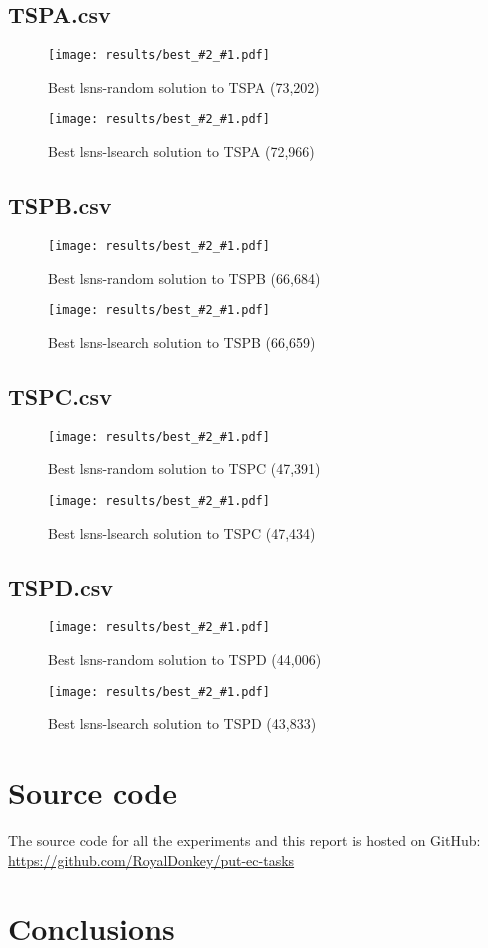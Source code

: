 \documentclass[14pt]{article}
\begin{document}
\newcommand{\visualization}[3]{%
\begin{figure}[H]%
	\texttt{[image: results/best\_\#2\_\#1.pdf]}%
	\vspace{-12mm}%
	\caption{Best #2 solution to #1 (#3)}%
\end{figure}%
}

\subsection{TSPA.csv}
\visualization{TSPA}{lsns-random}{73,202}
\visualization{TSPA}{lsns-lsearch}{72,966}

\subsection{TSPB.csv}
\visualization{TSPB}{lsns-random}{66,684}
\visualization{TSPB}{lsns-lsearch}{66,659}

\subsection{TSPC.csv}
\visualization{TSPC}{lsns-random}{47,391}
\visualization{TSPC}{lsns-lsearch}{47,434}

\subsection{TSPD.csv}
\visualization{TSPD}{lsns-random}{44,006}
\visualization{TSPD}{lsns-lsearch}{43,833}

\section{Source code}
The source code for all the experiments and this report is hosted on GitHub: \\
\url{https://github.com/RoyalDonkey/put-ec-tasks}

\section{Conclusions}
\end{document}

